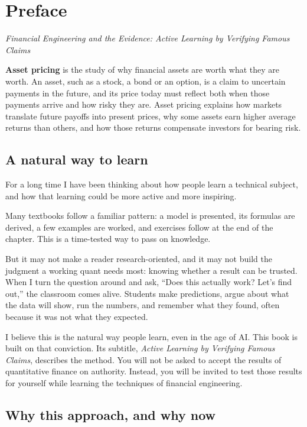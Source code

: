 \chapter*{Preface}

\emph{Financial Engineering and the Evidence: Active Learning by Verifying Famous Claims}


\textbf{Asset pricing} is the study of why financial assets are worth what they are worth. An asset, such as a stock, a bond or an option, is a claim to uncertain payments in the future, and its price today must reflect both when those payments arrive and how risky they are. Asset pricing explains how markets translate future payoffs into present prices, why some assets earn higher average returns than others, and how those returns compensate investors for bearing risk. 

\section*{A natural way to learn}

For a long time I have been thinking about how people learn a technical subject, and how that learning could be more active and more inspiring.

Many textbooks follow a familiar pattern: a model is presented, its formulas are derived, a few examples are worked, and exercises follow at the end of the chapter. This is a time-tested way to pass on knowledge.

But it may not make a reader research-oriented, and it may not build the judgment a working quant needs most: knowing whether a result can be trusted. When I turn the question around and ask, ``Does this actually work? Let's find out,'' the classroom comes alive. Students make predictions, argue about what the data will show, run the numbers, and remember what they found, often because it was not what they expected.

I believe this is the natural way people learn, even in the age of AI. This book is built on that conviction. Its subtitle, \emph{Active Learning by Verifying Famous Claims}, describes the method. You will not be asked to accept the results of quantitative finance on authority. Instead, you will be invited to test those results for yourself while learning the techniques of financial engineering.

\section*{Why this approach, and why now}

